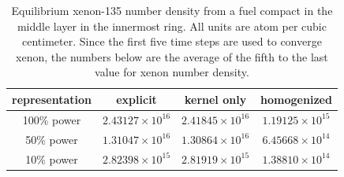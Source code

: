\documentclass[letterpaper]{physor2024}
\begin{document}
\begin{table}[!h]
    \centering
    \caption{Equilibrium xenon-135 number density from a fuel compact in the middle layer in the innermost ring. All units are atom per cubic centimeter. Since the first five time steps are used to converge xenon, the numbers below are the average of the fifth to the last value for xenon number density.}
    \begin{tabular}{|c|c|c|c|} \hline
    representation & explicit & kernel only & homogenized \\ \hline
    100\% power & $2.43127\times 10^{16}$ & $2.41845\times 10^{16}$ & $1.19125\times 10^{15}$ \\  \hline
    50\% power & $1.31047\times 10^{16}$ & $1.30864\times 10^{16}$ & $6.45668\times 10^{14}$ \\ \hline
    10\% power & $2.82398\times 10^{15}$ & $2.81919\times 10^{15}$ & $1.38810\times 10^{14}$ \\ \hline
    \end{tabular}
    \label{tab:xenons}
\end{table}
\end{document}
